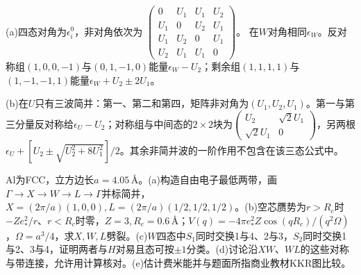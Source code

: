 \begin{solution}
(a)四态对角为$\epsilon_i^0$，非对角依次为
$\left(\begin{smallmatrix}0&U_1&U_1&U_2\\U_1&0&U_2&U_1\\U_1&U_2&0&U_1\\U_2&U_1&U_1&0\end{smallmatrix}\right)$。
在$W$对角相同$\epsilon_W$。反对称组$(1,0,0,-1)$与$(0,1,-1,0)$能量$\epsilon_W-U_2$；剩余组$(1,1,1,1)$与$(1,-1,-1,1)$能量$\epsilon_W+U_2\pm2U_1$。

(b)在$U$只有三波简并：第一、第二和第四，矩阵非对角为$(U_1,U_2,U_1)$。第一与第三分量反对称给$\epsilon_U-U_2$；对称组与中间态的$2\times2$块为$\left(\begin{smallmatrix}U_2&\sqrt2U_1\\\sqrt2U_1&0\end{smallmatrix}\right)$，另两根$\epsilon_U+[U_2\pm\sqrt{U_2^2+8U_1^2}]/2$。其余非简并波的一阶作用不包含在该三态公式中。
\end{solution}
\begin{exercise}[原题1(a)--(e)]
Al为FCC，立方边长$a=4.05\,\text{\AA}$。(a)构造自由电子最低两带，画$\Gamma\to X\to W\to L\to\Gamma$并标简并，$X=(2\pi/a)(1,0,0),L=(2\pi/a)(1/2,1/2,1/2)$。(b)空芯赝势为$r>R_c$时$-Ze_*^2/r$、$r<R_c$时零，$Z=3,R_c=0.6\,\text{\AA}$；$V(q)=-4\pi e_*^2Z\cos(qR_c)/(q^2\Omega)$，$\Omega=a^3/4$，求$X,W,L$劈裂。(c)$W$四态中$S_1$同时交换1与4、2与3，$S_2$同时交换1与2、3与4，证明两者与$H$对易且态可按$\pm1$分类。(d)讨论沿$XW$、$WL$的这些对称与带连接，允许用计算核对。(e)估计费米能并与题面所指商业教材KKR图比较。
\end{exercise}

